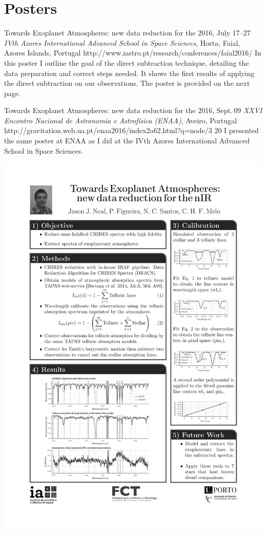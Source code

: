 \section{Posters}\label{app_sec:posters}

 {Towards Exoplanet Atmospheres: new data reduction for the \nir{}}%
{2016, July 17--27}%
{\textit{IVth Azores International Advanced School in Space Sciences}, Horta, Faial, Azores Islands, Portugal}%
{http://www.iastro.pt/research/conferences/faial2016/}%
{}%
{In this poster I outline the goal of the direct subtraction technique, detailing the data preparation and correct steps needed.
    It shows the first results of applying the direct subtraction on our observations.
    The poster is provided on the next page.}%


 {Towards Exoplanet Atmospheres: new data reduction for the \nir{}}%
{2016, Sept.\,09}%
{\textit{XXVI Encontro Nacional de Astronomia e Astrofísica (ENAA)}, Aveiro, Portugal}%
{ http://gravitation.web.ua.pt/enaa2016/index2a62.html?q=node/3}%
{20}%
{I presented the same poster at ENAA as I did at the IVth Azores International Advanced School in Space Sciences.}


{\centering \includegraphics[width=1\textwidth, keepaspectratio=true, page = 1, trim = 1.5cm 1cm 1.5cm 1cm, clip = true]{appendices/papers/Azores2016_grey}}